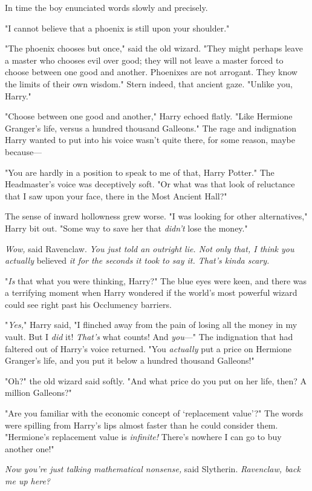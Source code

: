 In time the boy enunciated words slowly and precisely.

"I cannot believe that a phoenix is still upon your shoulder."

"The phoenix chooses but once," said the old wizard. "They might perhaps leave 
a master who chooses evil over good; they will not leave a master forced to 
choose between one good and another. Phoenixes are not arrogant. They know the 
limits of their own wisdom." Stern indeed, that ancient gaze. "Unlike you, 
Harry."

"Choose between one good and another," Harry echoed flatly. "Like Hermione 
Granger's life, versus a hundred thousand Galleons." The rage and indignation 
Harry wanted to put into his voice wasn't quite there, for some reason, maybe 
because---

"You are hardly in a position to speak to me of that, Harry Potter." The 
Headmaster's voice was deceptively soft. "Or what was that look of reluctance 
that I saw upon your face, there in the Most Ancient Hall?"

The sense of inward hollowness grew worse. "I was looking for other 
alternatives," Harry bit out. "Some way to save her that \emph{didn't} lose the 
money."

\emph{Wow,} said Ravenclaw. \emph{You just told an outright lie. Not only that, 
I think you actually} believed \emph{it for the seconds it took to say it. 
That's kinda scary.}

"\emph{Is} that what you were thinking, Harry?" The blue eyes were keen, and 
there was a terrifying moment when Harry wondered if the world's most powerful 
wizard could see right past his Occlumency barriers.

"\emph{Yes,}" Harry said, "I flinched away from the pain of losing all the 
money in my vault. But I \emph{did} it! \emph{That's} what counts! And 
\emph{you}---" The indignation that had faltered out of Harry's voice returned. 
"You \emph{actually} put a price on Hermione Granger's life, and you put it 
below a hundred thousand Galleons!"

"Oh?" the old wizard said softly. "And what price do you put on her life, then? 
A million Galleons?"

"Are you familiar with the economic concept of `replacement value'?" The words 
were spilling from Harry's lips almost faster than he could consider them. 
"Hermione's replacement value is \emph{infinite!} There's nowhere I can go to 
buy another one!"

\emph{Now you're just talking mathematical nonsense,} said Slytherin. 
\emph{Ravenclaw, back me up here?}

